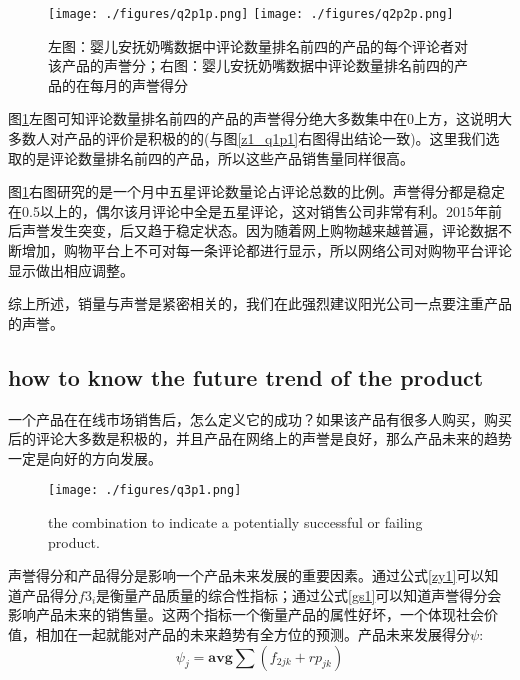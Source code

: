 \documentclass[UTF8]{article}
\begin{document}
\begin{figure}[H]
	\texttt{[image: ./figures/q2p1p.png]}
	\texttt{[image: ./figures/q2p2p.png]}
	\caption{左图：婴儿安抚奶嘴数据中评论数量排名前四的产品的每个评论者对该产品的声誉分；右图：婴儿安抚奶嘴数据中评论数量排名前四的产品的在每月的声誉得分} \label{q2p1}
\end{figure}

图\ref{q2p1}左图可知评论数量排名前四的产品的声誉得分绝大多数集中在0上方，这说明大多数人对产品的评价是积极的的(与图\ref{z1_q1p1}右图得出结论一致)。这里我们选取的是评论数量排名前四的产品，所以这些产品销售量同样很高。

图\ref{q2p1}右图研究的是一个月中五星评论数量论占评论总数的比例。声誉得分都是稳定在0.5以上的，偶尔该月评论中全是五星评论，这对销售公司非常有利。2015年前后声誉发生突变，后又趋于稳定状态。因为随着网上购物越来越普遍，评论数据不断增加，购物平台上不可对每一条评论都进行显示，所以网络公司对购物平台评论显示做出相应调整。

综上所述，销量与声誉是紧密相关的，我们在此强烈建议阳光公司一点要注重产品的声誉。

\subsection{how to know  the future trend of the product }
一个产品在在线市场销售后，怎么定义它的成功？如果该产品有很多人购买，购买后的评论大多数是积极的，并且产品在网络上的声誉是良好，那么产品未来的趋势一定是向好的方向发展。

\begin{figure}[H]
	\centering
	\texttt{[image: ./figures/q3p1.png]}
	\caption{the combination to indicate a potentially successful or failing product.} \label{q3p11}
\end{figure}

声誉得分和产品得分是影响一个产品未来发展的重要因素。通过公式\ref{zy1}可以知道产品得分$f3_i$是衡量产品质量的综合性指标；通过公式\ref{gs1}可以知道声誉得分会影响产品未来的销售量。这两个指标一个衡量产品的属性好坏，一个体现社会价值，相加在一起就能对产品的未来趋势有全方位的预测。产品未来发展得分$\psi$:
\begin{equation}\label{gs4q1}
\psi_j=\mathbf{avg}\sum (f_{2jk}+rp_{jk})
\end{equation}
\end{document}

